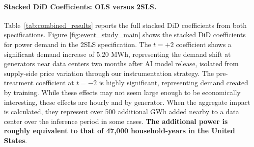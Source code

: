 \documentclass[sigconf]{acmart}
\newcommand{\nb}[1]{\textcolor{blue}{NB[#1]}}
\begin{document}
\paragraph{Stacked DiD Coefficients: OLS versus 2SLS.} Table~\ref{tab:combined_results} reports the full stacked DiD coefficients from both specifications. Figure \ref{fig:event_study_main} shows the stacked DiD coefficients for power demand in the 2SLS specification. The $t=+2$ coefficient shows a significant demand increase of 5.20 MWh, representing the demand shift at generators near data centers two months after AI model release, isolated from supply-side price variation through our instrumentation strategy. The pre-treatment coefficient at $t=−2$ is highly significant, representing demand created by training. While these effects may not seem large enough to be economically interesting, these effects are hourly and by generator. When the aggregate impact is calculated, they represent over 500 additional GWh added nearby to a data center over the inference period in some cases. \textbf{The additional power is roughly equivalent to that of 47,000 household-years in the United States}.

\end{document}
